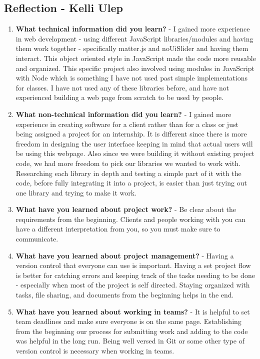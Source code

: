 
\subsection{Reflection - Kelli Ulep}
\begin{enumerate}
    \item \textbf{What technical information did you learn?} 
    - I gained more experience in web development - using different JavaScript libraries/modules and having them work together - specifically matter.js and noUiSlider and having them interact. This object oriented style in JavaScript made the code more reusable and organized. This specific project also involved using modules in JavaScript with Node which is something I have not used past simple implementations for classes.
    I have not used any of these libraries before, and have not experienced building a web page from scratch to be used by people. 
    
    \item \textbf{What non-technical information did you learn?} 
    - I gained more experience in creating software for a client rather than for a class or just being assigned a project for an internship. 
    It is different since there is more freedom in designing the user interface keeping in mind that actual users will be using this webpage. Also since we were building it without existing project code, we had more freedom to pick our libraries we wanted to work with. Researching each library in depth and testing a simple part of it with the code,  before fully integrating it into a project, is easier than just trying out one library and trying to make it work.
    
    \item \textbf{What have you learned about project work?}
    - Be clear about the requirements from the beginning. Clients and people working with you can have a different interpretation from you, so you must make sure to communicate. 
    
    \item \textbf{What have you learned about project management?}
    - Having a version control that everyone can use is important. 
    Having a set project flow is better for catching errors and keeping track of the tasks needing to be done - especially when most of the project is self directed.
    Staying organized with tasks, file sharing, and documents from the beginning helps in the end.
    
    \item \textbf{What have you learned about working in teams?}
    - It is helpful to set team deadlines and make sure everyone is on the same page. Establishing from the beginning our process for submitting work and adding to the code was helpful in the long run. Being well versed in Git or some other type of version control is necessary when working in teams. 
    

\end{enumerate}
